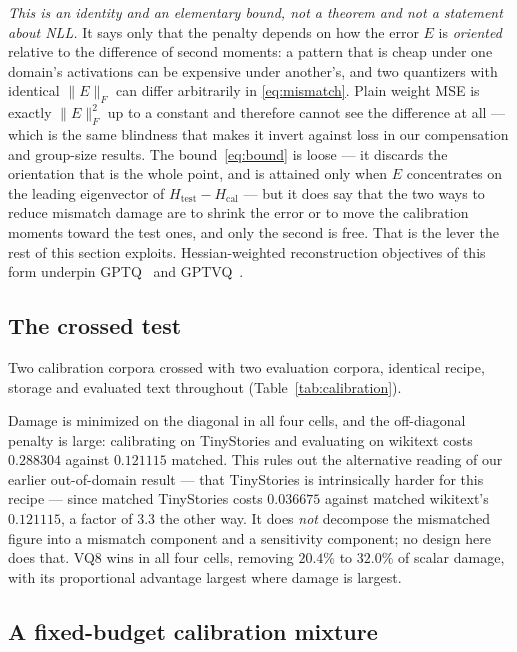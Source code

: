 \documentclass[11pt]{article}
\begin{document}
\emph{This is an identity and an elementary bound, not a theorem and not a
statement about NLL.} It says only that the penalty depends on how the error
$E$ is \emph{oriented} relative to the difference of second moments: a pattern
that is cheap under one domain's activations can be expensive under another's,
and two quantizers with identical $\lVert E \rVert_F$ can differ arbitrarily
in \eqref{eq:mismatch}. Plain weight MSE is exactly $\lVert E \rVert_F^2$ up
to a constant and therefore cannot see the difference at all --- which is the
same blindness that makes it invert against loss in our compensation and
group-size results. The bound~\eqref{eq:bound} is loose --- it discards the
orientation that is the whole point, and is attained only when $E$ concentrates
on the leading eigenvector of $H_{\mathrm{test}} - H_{\mathrm{cal}}$ --- but it
does say that the two ways to reduce mismatch damage are to shrink the error or
to move the calibration moments toward the test ones, and only the second is
free. That is the lever the rest of this section exploits. Hessian-weighted
reconstruction objectives of this form underpin GPTQ~\cite{gptq} and
GPTVQ~\cite{gptvq}.

\subsection{The crossed test}

Two calibration corpora crossed with two evaluation corpora, identical recipe,
storage and evaluated text throughout (Table~\ref{tab:calibration}).





Damage is minimized on the diagonal in all four cells, and the off-diagonal
penalty is large: calibrating on TinyStories and evaluating on wikitext costs
$0.288304$ against $0.121115$ matched. This rules out the alternative reading
of our earlier out-of-domain result --- that TinyStories is intrinsically
harder for this recipe --- since matched TinyStories costs $0.036675$ against
matched wikitext's $0.121115$, a factor of $3.3$ the other way. It does
\emph{not} decompose the mismatched figure into a mismatch component and a
sensitivity component; no design here does that. VQ8 wins in all four cells,
removing $20.4\%$ to $32.0\%$ of scalar damage, with its proportional advantage
largest where damage is largest.

\subsection{A fixed-budget calibration mixture}
\end{document}
